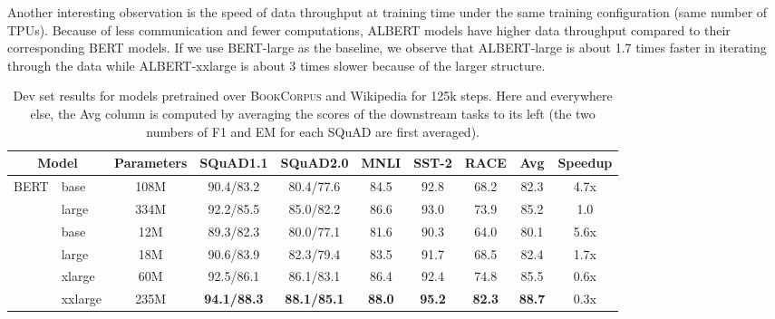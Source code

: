 Another interesting observation is the speed of data throughput at training time under the same training configuration (same number of TPUs). 
Because of less communication and fewer computations, ALBERT models have higher data throughput compared to their corresponding BERT models.
If we use BERT-large as the baseline, we observe that ALBERT-large is about 1.7 times faster in iterating through the data while ALBERT-xxlarge is about 3 times slower because of the larger structure. 


\begin{table}[!htbp] 
\setlength{\tabcolsep}{5pt}
\small
\centering
\begin{tabular}{ l l | c c c c c c | c | c}
 \multicolumn{2}{c}{Model}    &Parameters        	&SQuAD1.1	&SQuAD2.0	&MNLI	&SST-2	&RACE	&Avg & Speedup\\
\hline
\multirow{3}{*}{BERT} &base	     &108M       &90.4/83.2	&80.4/77.6	&84.5	&92.8	&68.2	&82.3 & 4.7x \\

    &large	        &334M	&92.2/85.5	&85.0/82.2	&86.6	&93.0	&73.9	&85.2 & 1.0\\
\hline 
\multirow{4}{*}{ALBERT}  &base	      &12M    	    &89.3/82.3	&80.0/77.1	&81.6	&90.3	&64.0	&80.1 &5.6x \\
&large	        	 &18M   &90.6/83.9	&82.3/79.4	&83.5	&91.7	&68.5	&82.4 &1.7x\\
&xlarge		   &60M   &92.5/86.1	&86.1/83.1	&86.4	&92.4	&74.8	&85.5 & 0.6x\\
&xxlarge	&235M	& \textbf{94.1/88.3}	&\textbf{88.1/85.1}	&\textbf{88.0}	&\textbf{95.2}	&\textbf{82.3}	&\textbf{88.7} & 0.3x\\
\end{tabular}
\caption{Dev set results for models pretrained over \textsc{BookCorpus} and Wikipedia for 125k steps.
Here and everywhere else, the Avg column is computed by averaging the scores of the downstream tasks to its left (the two numbers of F1 and EM for each SQuAD are first averaged).}
\label{table:overall_comparison}
\end{table}

